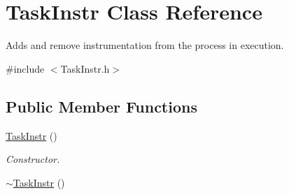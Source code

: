 \hypertarget{class_task_instr}{\section{Task\-Instr Class Reference}
\label{class_task_instr}
}


Adds and remove instrumentation from the process in execution.  




{\ttfamily \#include $<$Task\-Instr.\-h$>$}

\subsection*{Public Member Functions}
\begin{DoxyCompactItemize}
\item 
\hypertarget{class_task_instr_aecef8b4b1b380baf8a9a45c4df3d822e}{\hyperlink{class_task_instr_aecef8b4b1b380baf8a9a45c4df3d822e}{Task\-Instr} ()}\label{class_task_instr_aecef8b4b1b380baf8a9a45c4df3d822e}

\begin{DoxyCompactList}\small\item\em Constructor. \end{DoxyCompactList}\item 
\hypertarget{class_task_instr_acea41f0e1f0f649e4243c65bc708ed5b}{\hyperlink{class_task_instr_acea41f0e1f0f649e4243c65bc708ed5b}{$\sim$\-Task\-Instr} ()}\label{class_task_instr_acea41f0e1f0f649e4243c65bc708ed5b}


\end{DoxyCompactItemize}
